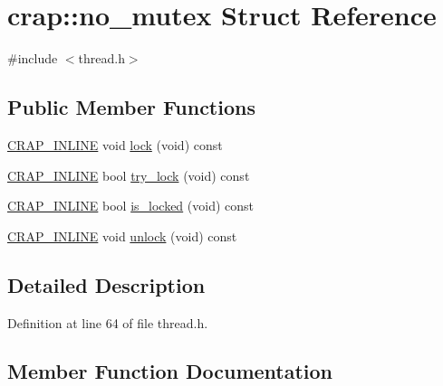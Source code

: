 \hypertarget{structcrap_1_1no__mutex}{}\section{crap\+:\+:no\+\_\+mutex Struct Reference}
\label{structcrap_1_1no__mutex}


{\ttfamily \#include $<$thread.\+h$>$}

\subsection*{Public Member Functions}
\begin{DoxyCompactItemize}
\item 
\hyperlink{config__x86_8h_a5a40526b8d842e7ff731509998bb0f1c}{C\+R\+A\+P\+\_\+\+I\+N\+L\+I\+N\+E} void \hyperlink{structcrap_1_1no__mutex_a95804d4ab018f6f159920dc525f5df68}{lock} (void) const 
\item 
\hyperlink{config__x86_8h_a5a40526b8d842e7ff731509998bb0f1c}{C\+R\+A\+P\+\_\+\+I\+N\+L\+I\+N\+E} bool \hyperlink{structcrap_1_1no__mutex_aae78dc2a9a44ae42e2f21361d0d96d89}{try\+\_\+lock} (void) const 
\item 
\hyperlink{config__x86_8h_a5a40526b8d842e7ff731509998bb0f1c}{C\+R\+A\+P\+\_\+\+I\+N\+L\+I\+N\+E} bool \hyperlink{structcrap_1_1no__mutex_a0a22c1b4c5152a378e8a35451c0d22fe}{is\+\_\+locked} (void) const 
\item 
\hyperlink{config__x86_8h_a5a40526b8d842e7ff731509998bb0f1c}{C\+R\+A\+P\+\_\+\+I\+N\+L\+I\+N\+E} void \hyperlink{structcrap_1_1no__mutex_a56d77194a18047876ad2cfcb3d9c39be}{unlock} (void) const 
\end{DoxyCompactItemize}


\subsection{Detailed Description}


Definition at line 64 of file thread.\+h.



\subsection{Member Function Documentation}
\hypertarget{structcrap_1_1no__mutex_a0a22c1b4c5152a378e8a35451c0d22fe}{}
